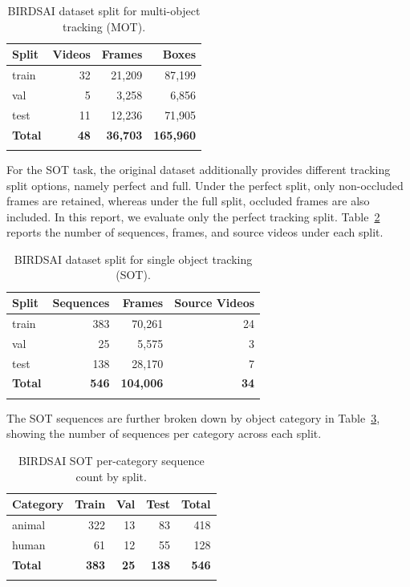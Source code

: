 \documentclass[
]{article}
\begin{document}
\renewcommand{\arraystretch}{1.3}
\begin{longtable}[c]{@{}lrrr@{}}
\rowcolor{gray!20}
\textbf{Split} & \textbf{Videos} & \textbf{Frames} & \textbf{Boxes} \\
\midrule
\endhead
train          & 32     & 21{,}209 & 87{,}199  \\
val            & 5      &  3{,}258 &  6{,}856  \\
test           & 11     & 12{,}236 & 71{,}905  \\
\midrule
\textbf{Total} & \textbf{48} & \textbf{36{,}703} & \textbf{165{,}960} \\
\caption{BIRDSAI dataset split for multi-object tracking (MOT).\label{tab:birdsai-mot-split}}\\
\end{longtable}
\renewcommand{\arraystretch}{1}

For the SOT task, the original dataset additionally provides different tracking split options, namely perfect and full. Under the perfect split, only non-occluded frames are retained, whereas under the full split, occluded frames are also included. In this report, we evaluate only the perfect tracking split. Table~\ref{tab:birdsai-sot-split} reports the number of sequences, frames, and source videos under each split.

\renewcommand{\arraystretch}{1.3}
\begin{longtable}[c]{@{}lrrr@{}}
\rowcolor{gray!20}
\textbf{Split} & \textbf{Sequences} & \textbf{Frames} & \textbf{Source Videos} \\
\midrule
\endhead
train          & 383     & 70{,}261  & 24 \\
val            &  25     &  5{,}575  &  3 \\
test           & 138     & 28{,}170  &  7 \\
\midrule
\textbf{Total} & \textbf{546} & \textbf{104{,}006} & \textbf{34} \\
\caption{BIRDSAI dataset split for single object tracking (SOT).\label{tab:birdsai-sot-split}}\\
\end{longtable}
\renewcommand{\arraystretch}{1}

The SOT sequences are further broken down by object category in Table~\ref{tab:birdsai-sot-category}, showing the number of sequences per category across each split.

\renewcommand{\arraystretch}{1.3}
\begin{longtable}[c]{@{}lrrrr@{}}
\rowcolor{gray!20}
\textbf{Category} & \textbf{Train} & \textbf{Val} & \textbf{Test} & \textbf{Total} \\
\midrule
\endhead
animal         & 322 & 13 &  83 & 418 \\
human          &  61 & 12 &  55 & 128 \\
\midrule
\textbf{Total} & \textbf{383} & \textbf{25} & \textbf{138} & \textbf{546} \\
\caption{BIRDSAI SOT per-category sequence count by split.\label{tab:birdsai-sot-category}}\\
\end{longtable}
\renewcommand{\arraystretch}{1}
\end{document}
